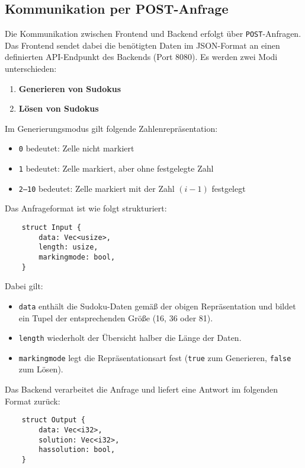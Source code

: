 \subsection{Kommunikation per POST-Anfrage}

Die Kommunikation zwischen Frontend und Backend erfolgt über \texttt{POST}-Anfragen. Das Frontend sendet dabei die benötigten Daten im JSON-Format an einen definierten API-Endpunkt des Backends (Port 8080).  
Es werden zwei Modi unterschieden:
\begin{enumerate}
	\item \textbf{Generieren von Sudokus}
	\item \textbf{Lösen von Sudokus}
\end{enumerate}

Im Generierungsmodus gilt folgende Zahlenrepräsentation:
\begin{itemize}
	\item \texttt{0} bedeutet: Zelle nicht markiert
	\item \texttt{1} bedeutet: Zelle markiert, aber ohne festgelegte Zahl
	\item \texttt{2--10} bedeutet: Zelle markiert mit der Zahl $(i-1)$ festgelegt
\end{itemize}

Das Anfrageformat ist wie folgt strukturiert:

\begin{verbatim}
	struct Input {
		data: Vec<usize>,
		length: usize,
		markingmode: bool,  
	}
\end{verbatim}

Dabei gilt:
\begin{itemize}
	\item \texttt{data} enthält die Sudoku-Daten gemäß der obigen Repräsentation und bildet ein Tupel der entsprechenden Größe (16, 36 oder 81).
	\item \texttt{length} wiederholt der Übersicht halber die Länge der Daten.
	\item \texttt{markingmode} legt die Repräsentationsart fest (\texttt{true} zum Generieren, \texttt{false} zum Lösen).
\end{itemize}

Das Backend verarbeitet die Anfrage und liefert eine Antwort im folgenden Format zurück:

\begin{verbatim}
	struct Output {
		data: Vec<i32>,
		solution: Vec<i32>,
		hassolution: bool,
	}
\end{verbatim}

